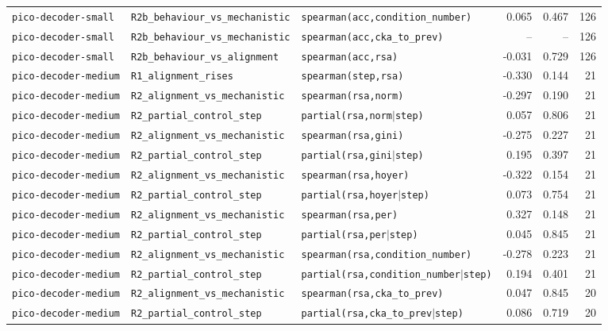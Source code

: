 \begin{longtable}{lllrrr}
\texttt{pico-decoder-small} & \texttt{R2b\_behaviour\_vs\_mechanistic} & \texttt{spearman(acc,condition\_number)} & 0.065 & 0.467 & 126 \\
\texttt{pico-decoder-small} & \texttt{R2b\_behaviour\_vs\_mechanistic} & \texttt{spearman(acc,cka\_to\_prev)} & -- & -- & 126 \\
\texttt{pico-decoder-small} & \texttt{R2b\_behaviour\_vs\_alignment} & \texttt{spearman(acc,rsa)} & -0.031 & 0.729 & 126 \\
\texttt{pico-decoder-medium} & \texttt{R1\_alignment\_rises} & \texttt{spearman(step,rsa)} & -0.330 & 0.144 & 21 \\
\texttt{pico-decoder-medium} & \texttt{R2\_alignment\_vs\_mechanistic} & \texttt{spearman(rsa,norm)} & -0.297 & 0.190 & 21 \\
\texttt{pico-decoder-medium} & \texttt{R2\_partial\_control\_step} & \texttt{partial(rsa,norm$\mid$step)} & 0.057 & 0.806 & 21 \\
\texttt{pico-decoder-medium} & \texttt{R2\_alignment\_vs\_mechanistic} & \texttt{spearman(rsa,gini)} & -0.275 & 0.227 & 21 \\
\texttt{pico-decoder-medium} & \texttt{R2\_partial\_control\_step} & \texttt{partial(rsa,gini$\mid$step)} & 0.195 & 0.397 & 21 \\
\texttt{pico-decoder-medium} & \texttt{R2\_alignment\_vs\_mechanistic} & \texttt{spearman(rsa,hoyer)} & -0.322 & 0.154 & 21 \\
\texttt{pico-decoder-medium} & \texttt{R2\_partial\_control\_step} & \texttt{partial(rsa,hoyer$\mid$step)} & 0.073 & 0.754 & 21 \\
\texttt{pico-decoder-medium} & \texttt{R2\_alignment\_vs\_mechanistic} & \texttt{spearman(rsa,per)} & 0.327 & 0.148 & 21 \\
\texttt{pico-decoder-medium} & \texttt{R2\_partial\_control\_step} & \texttt{partial(rsa,per$\mid$step)} & 0.045 & 0.845 & 21 \\
\texttt{pico-decoder-medium} & \texttt{R2\_alignment\_vs\_mechanistic} & \texttt{spearman(rsa,condition\_number)} & -0.278 & 0.223 & 21 \\
\texttt{pico-decoder-medium} & \texttt{R2\_partial\_control\_step} & \texttt{partial(rsa,condition\_number$\mid$step)} & 0.194 & 0.401 & 21 \\
\texttt{pico-decoder-medium} & \texttt{R2\_alignment\_vs\_mechanistic} & \texttt{spearman(rsa,cka\_to\_prev)} & 0.047 & 0.845 & 20 \\
\texttt{pico-decoder-medium} & \texttt{R2\_partial\_control\_step} & \texttt{partial(rsa,cka\_to\_prev$\mid$step)} & 0.086 & 0.719 & 20 \\

\end{longtable}
